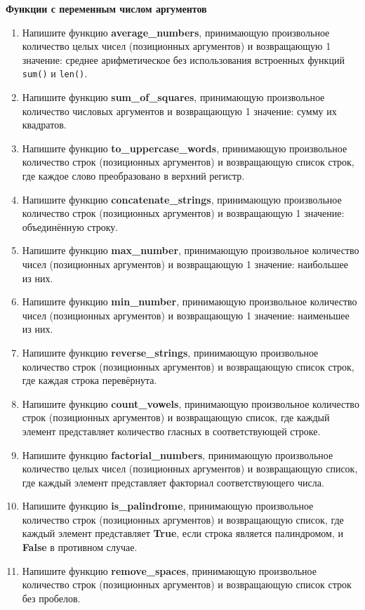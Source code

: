 \documentclass[a4,12pt]{article}
\theoremstyle{remark}
\begin{document}
\textbf{Функции с переменным числом аргументов}

\begin{enumerate}
    \item Напишите функцию \textbf{average\_numbers}, принимающую произвольное количество целых чисел (позиционных аргументов) и возвращающую 1 значение: среднее арифметическое без использования встроенных функций \texttt{sum()} и \texttt{len()}.
    \item Напишите функцию \textbf{sum\_of\_squares}, принимающую произвольное количество числовых аргументов и возвращающую 1 значение: сумму их квадратов.
    \item Напишите функцию \textbf{to\_uppercase\_words}, принимающую произвольное количество строк (позиционных аргументов) и возвращающую список строк, где каждое слово преобразовано в верхний регистр.
    \item Напишите функцию \textbf{concatenate\_strings}, принимающую произвольное количество строк (позиционных аргументов) и возвращающую 1 значение: объединённую строку.
    \item Напишите функцию \textbf{max\_number}, принимающую произвольное количество чисел (позиционных аргументов) и возвращающую 1 значение: наибольшее из них.
    \item Напишите функцию \textbf{min\_number}, принимающую произвольное количество чисел (позиционных аргументов) и возвращающую 1 значение: наименьшее из них.
    \item Напишите функцию \textbf{reverse\_strings}, принимающую произвольное количество строк (позиционных аргументов) и возвращающую список строк, где каждая строка перевёрнута.
    \item Напишите функцию \textbf{count\_vowels}, принимающую произвольное количество строк (позиционных аргументов) и возвращающую список, где каждый элемент представляет количество гласных в соответствующей строке.
    \item Напишите функцию \textbf{factorial\_numbers}, принимающую произвольное количество целых чисел (позиционных аргументов) и возвращающую список, где каждый элемент представляет факториал соответствующего числа.
    \item Напишите функцию \textbf{is\_palindrome}, принимающую произвольное количество строк (позиционных аргументов) и возвращающую список, где каждый элемент представляет \textbf{True}, если строка является палиндромом, и \textbf{False} в противном случае.
    \item Напишите функцию \textbf{remove\_spaces}, принимающую произвольное количество строк (позиционных аргументов) и возвращающую список строк без пробелов.

\end{enumerate}
\end{document}
